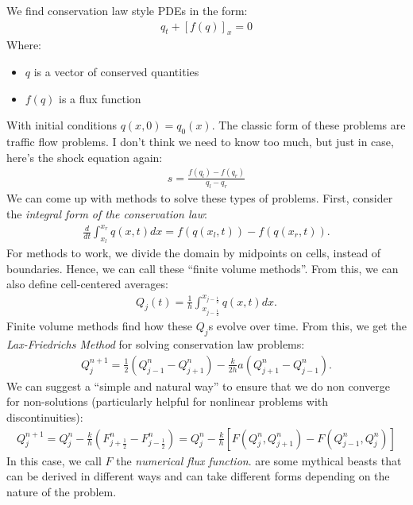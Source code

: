 \documentclass{article}
\begin{document}
We find conservation law style PDEs in the form:
\begin{align*}
  q_t + \left[f(q)\right]_x = 0
\end{align*}
Where:
\begin{itemize}
\item $q$ is a vector of conserved quantities
\item $f(q)$ is a flux function
\end{itemize}
With initial conditions $q(x, 0) = q_0(x)$.
\gap
{} The classic form of these problems are traffic flow problems. I don't think we need to know too much, but just in case, here's the shock equation again:
\begin{align*}
  s = \frac{f(q_l) - f(q_r)}{q_l - q_r}
\end{align*}
We can come up with methods to solve these types of problems. First, consider the
\textit{integral form of the conservation law}:
\begin{align*}
  \frac{d}{dt}\int_{x_l}^{x_r}q(x, t)dx = f(q(x_l, t)) - f(q(x_r, t)).
\end{align*}
For methods to work, we divide the domain by midpoints on cells, instead of boundaries.
Hence, we can call these ``finite volume methods''. From this, we can also define
cell-centered averages:
\begin{align*}
  Q_j(t) = \frac{1}{h}\int_{x_{j - \frac{1}{2}}}^{x_{j - \frac{1}{2}}}q(x, t)dx.
\end{align*}
Finite volume methods find how these $Q_j$s evolve over time.
\gap
{} From this, we get the \textit{Lax-Friedrichs Method} for
solving conservation law problems:
\begin{align*}
  Q_j^{n + 1} = \frac{1}{2}(Q_{j-1}^n - Q^n_{j+ 1}) - \frac{k}{2h}a \left(Q_{j+1}^n - Q_{j-1}^n\right).
\end{align*}
 We can suggest a ``simple and natural way'' to ensure that
we do non converge for non-solutions (particularly helpful for nonlinear problems with discontinuities):
\begin{align*}
  Q_j^{n+1} = Q_j^n - \frac{k}{h} \left(F^n_{j+ \frac{1}{2}} - F^n_{j - \frac{1}{2}}\right) = Q_j^n - \frac{k}{h} \left[F(Q_j^n, Q_{j+1}^n) - F(Q_{j-1}^n, Q_j^n)\right]
\end{align*}
In this case, we call $F$ the \textit{numerical flux function}.
\gap
{} are some mythical beasts that can be derived in
different ways and can take different forms depending on the nature of the problem.
\end{document}
